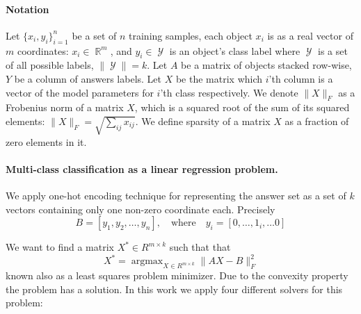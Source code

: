 \documentclass{article}
\DeclareMathOperator*{\argmax}{argmax}
\DeclareMathOperator{\R}{\mathbb{R}}
\DeclareMathOperator{\YY}{\mathcal{Y}}
\begin{document}
\paragraph{Notation} Let $\{x_i, y_i\}_{i = 1}^n$ be a set of $n$ training samples, each object $x_i$ is as a real vector of $m$ coordinates: $x_i \in \R^m$, and $y_i \in \YY$ is an object's class label where $\YY$ is a set of all possible labels, $\|\YY\| = k$. Let $A$ be a matrix of objects stacked row-wise, $Y$ be a column of answers labels. Let $X$ be the matrix which $i$'th column is a vector of the model parameters for $i$'th class respectively. We denote $\|X\|_F$ as a Frobenius norm of a matrix $X$, which is a squared root of the sum of its squared elements: $\|X\|_F = \sqrt{\sum_{ij}x_{ij}}$. We define sparsity of a matrix $X$ as a fraction of zero elements in it.

\paragraph{Multi-class classification as a linear regression problem.} We apply one-hot encoding technique for representing the answer set as a set of $k$ vectors containing only one non-zero coordinate each. Precisely 
    \begin{equation}
        \label{eq:ohe_answers}
        B = [y_1, y_2, \dots, y_n], \quad \text{where} \quad y_i = [0, \dots, 1_i, \dots 0]
    \end{equation}
    
    We want to find a matrix $X^* \in R^{m \times k}$ such that that 
    \begin{equation}
        \label{eq:least_squares}
        X^* = \argmax_{X \in R^{m \times k}} \|AX - B\|^2_F
    \end{equation}
    known also as a least squares problem minimizer. Due to the convexity property the problem has a solution.
    In this work we apply four different solvers for this problem:
\end{document}
